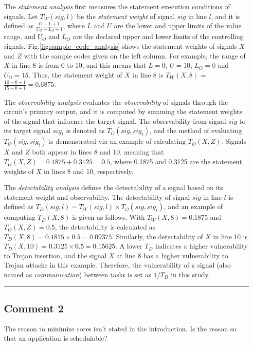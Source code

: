 \documentclass[10pt,journal, compsoc]{IEEEtran}
\begin{document}
The \textit{statement analysis} first measures the statement execution conditions of signals. Let $T_W(sig, l)$ be the \textit{statement weight} of signal $sig$ in line $l$, and it is defined as $\frac{U-L+1}{U_O-L_O+1}$, where $L$ and $U$ are the lower and upper limits of the value range, and $U_O$ and $L_O$ are the declared upper and lower limits of the controlling signals. Fig.\ref{fig:sample_code_analysis} shows the statement weights of signals $X$ and $Z$ with the sample codes given on the left column. For example, the range of $X$ in line 8 is from 0 to 10, and this means that $L = 0$, $U = 10$, $L_O = 0$ and $U_O = 15$. Thus, the statement weight of $X$ in line 8  is $T_W(X,8)$ = $\frac{10-0+1}{15-0+1} = 0.6875$.

The \textit{observability analysis} evaluates the \textit{observability} of signals through the circuit's primary output, and it is computed by summing the statement weights of the signal that influence the target signal. The observability from signal $sig$ to its target signal $sig_t$ is denoted as $T_O(sig, sig_t)$, and the method of evaluating $T_O(sig, sig_t)$ is demonstrated via an example of calculating $T_O(X, Z)$. Signals $X$ and $Z$ both appear in lines 8 and 10, meaning that $T_O(X, Z)=0.1875 + 0.3125 = 0.5$, where 0.1875 and 0.3125 are the statement weights of $X$ in lines 8 and 10, respectively.

The \textit{detectability analysis} defines the detectability of a signal based on its statement weight and observability. The detectability of signal $sig$ in line $l$ is defined as $T_D(sig,l) = T_W(sig,l) \times T_O(sig,sig_t)$, and an example of computing $T_D(X,8)$ is given as follows. With $T_W(X,8)=0.1875$ and $T_O(X,Z)=0.5$, the detectability is calculated as $T_D(X,8) = 0.1875 \times 0.5 = 0.09375$. Similarly, the detectability of $X$ in line 10 is $T_D(X,10) = 0.3125 \times 0.5 = 0.15625$. A lower $T_D$ indicates a higher vulnerability to Trojan insertion, and the signal $X$ at line 8 has a higher vulnerability to Trojan attacks in this example. Therefore, the vulnerability of a signal (also named as \textit{communication})  between tasks is set as $1/T_D$ in this study.


\color{black}

\noindent\rule[0.25\baselineskip]{252pt}{1pt}

\subsection*{Comment 2}
The reason to minimize cores isn't stated in the introduction. Is the reason so that an application is schedulable?
\end{document}
